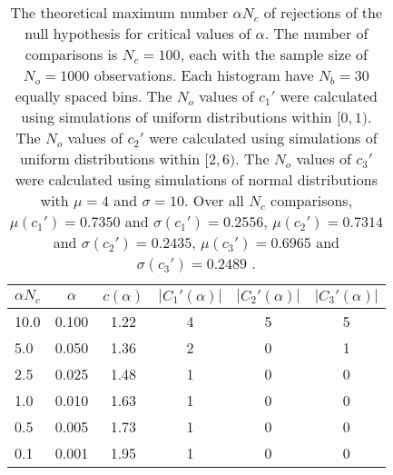 \begin{table}[h!]
\begin{center}
\begin{tabular}{| l | c | c | c | c | c |}\hline
$\alpha N_c$ & $\alpha$ & $c(\alpha)$ & $|C_1'(\alpha)|$ & $|C_2'(\alpha)|$ & $|C_3'(\alpha)|$ \\\hline
10.0 & 0.100 & 1.22 & 4 & 5 & 5 \\\hline
5.0 & 0.050 & 1.36 & 2 & 0 & 1 \\\hline
2.5 & 0.025 & 1.48 & 1 & 0 & 0 \\\hline
1.0 & 0.010 & 1.63 & 1 & 0 & 0 \\\hline
0.5 & 0.005 & 1.73 & 1 & 0 & 0 \\\hline
0.1 & 0.001 & 1.95 & 1 & 0 & 0 \\\hline
\end{tabular}
\caption{The theoretical maximum number $\alpha N_c$ of rejections
of the null hypothesis for critical values of $\alpha$.
The number of comparisons is $N_c=100$,
each with the sample size of $N_o=1000$ observations.
Each histogram have $N_b=30$ equally spaced bins.
The $N_o$ values of $c_1'$ were calculated using simulations of
 uniform distributions within $[0,1)$.
The $N_o$ values of $c_2'$ were calculated using simulations of
 uniform distributions within $[2,6)$.
The $N_o$ values of $c_3'$ were calculated using simulations of
 normal distributions with $\mu=4$ and $\sigma=10$.
Over all $N_c$ comparisons,
 $\mu(c_1')=0.7350$ and $\sigma(c_1')=0.2556$,
 $\mu(c_2')=0.7314$ and $\sigma(c_2')=0.2435$,
 $\mu(c_3')=0.6965$ and $\sigma(c_3')=0.2489$ .
}
\end{center}
\end{table}